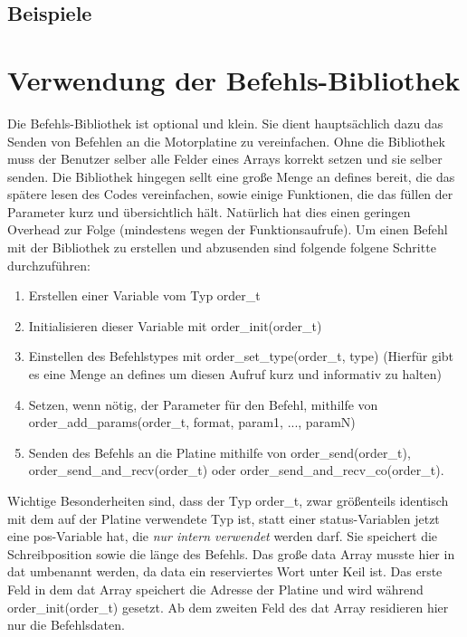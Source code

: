 \documentclass[a4paper]{article}
\begin{document}
	\subsection{Beispiele}
	\pagebreak

	
	\section{Verwendung der Befehls-Bibliothek}
	
	Die Befehls-Bibliothek ist optional und klein. Sie dient hauptsächlich dazu das Senden von Befehlen an
	die Motorplatine zu vereinfachen. Ohne die Bibliothek muss der Benutzer selber alle Felder eines Arrays
	korrekt setzen und sie selber senden. Die Bibliothek hingegen sellt eine große Menge an defines bereit,
	die das spätere lesen des Codes vereinfachen, sowie einige Funktionen, die das füllen der Parameter
	kurz und übersichtlich hält. Natürlich hat dies einen geringen Overhead zur Folge (mindestens wegen der
	Funktionsaufrufe).
	Um einen Befehl mit der Bibliothek zu erstellen und abzusenden sind folgende folgene Schritte durchzuführen:
	\begin{enumerate}
		\item Erstellen einer Variable vom Typ order\_t
		\item Initialisieren dieser Variable mit order\_init(order\_t)
		\item Einstellen des Befehlstypes mit order\_set\_type(order\_t, type) (Hierfür gibt es eine Menge an defines
			um diesen Aufruf kurz und informativ zu halten)
		\item Setzen, wenn nötig, der Parameter für den Befehl, mithilfe von order\_add\_params(order\_t, format, param1, ..., paramN)
		\item Senden des Befehls an die Platine mithilfe von order\_send(order\_t), order\_send\_and\_recv(order\_t) oder
			order\_send\_and\_recv\_co(order\_t).
	\end{enumerate}
	Wichtige Besonderheiten sind, dass der Typ order\_t, zwar größenteils identisch mit dem auf der Platine verwendete
	Typ ist, statt einer status-Variablen jetzt eine pos-Variable hat, die {\em nur intern verwendet} werden darf.
	Sie speichert die Schreibposition sowie die länge des Befehls. Das große data Array musste hier in dat umbenannt
	werden, da data ein reserviertes Wort unter Keil ist. Das erste Feld in dem dat Array speichert die Adresse der
	Platine und wird während order\_init(order\_t) gesetzt. Ab dem zweiten Feld des dat Array residieren hier nur die
	Befehlsdaten.
\end{document}
